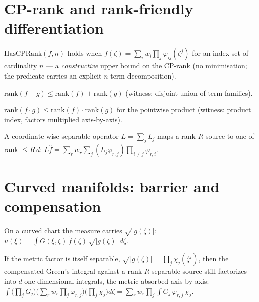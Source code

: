 \section{CP-rank and rank-friendly differentiation}

\begin{definition}\label{def:cp-rank}
  \leanok
  $\mathrm{HasCPRank}(f,n)$ holds when $f(\zeta)=\sum_{i}w_i\prod_j\varphi_{ij}(\zeta^j)$ for an
  index set of cardinality $n$ — a \emph{constructive} upper bound on the CP-rank (no
  minimisation; the predicate carries an explicit $n$-term decomposition).
\end{definition}

\begin{theorem}\label{thm:cp-rank-add}
  \leanok{}
  $\mathrm{rank}(f+g)\le\mathrm{rank}(f)+\mathrm{rank}(g)$ (witness: disjoint union of term families).
\end{theorem}

\begin{theorem}\label{thm:cp-rank-mul}
  \leanok{}
  $\mathrm{rank}(f\cdot g)\le\mathrm{rank}(f)\cdot\mathrm{rank}(g)$ for the pointwise product
  (witness: product index, factors multiplied axis-by-axis).
\end{theorem}

\begin{theorem}\label{thm:diff-rank-friendly}
  \leanok{}
  A coordinate-wise separable operator $L=\sum_jL_j$ maps a rank-$R$ source to one of rank
  $\le R\,d$: $L\hat f=\sum_r w_r\sum_j(L_j\varphi_{r,j})\prod_{i\ne j}\varphi_{r,i}$.
\end{theorem}

\section{Curved manifolds: barrier and compensation}

\begin{definition}\label{def:metric}
  On a curved chart the measure carries $\sqrt{|g(\zeta)|}$:
  $u(\xi)=\int G(\xi,\zeta)\,\tilde f(\zeta)\,\sqrt{|g(\zeta)|}\,d\zeta$.
\end{definition}

\begin{theorem}\label{thm:barrier-if}
  \leanok{}
  If the metric factor is itself separable, $\sqrt{|g(\zeta)|}=\prod_j\chi_j(\zeta^j)$, then the
  compensated Green's integral against a rank-$R$ separable source still factorizes into $d$
  one-dimensional integrals, the metric absorbed axis-by-axis:
  $\displaystyle \int\Big(\prod_jG_j\Big)\Big(\sum_r w_r\prod_j\varphi_{r,j}\Big)\Big(\prod_j\chi_j\Big)d\zeta
     =\sum_r w_r\prod_j\int G_j\,\varphi_{r,j}\,\chi_j$.
\end{theorem}

